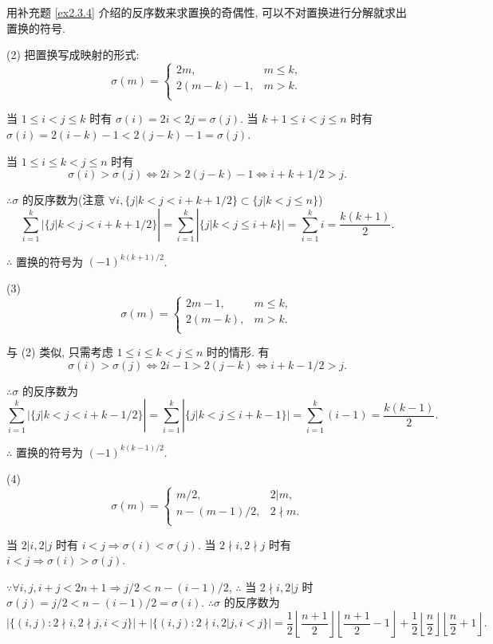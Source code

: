 \documentclass{ctexart}
\begin{document}
\begin{solution}
    用补充题 \ref{ex2.3.4} 介绍的反序数来求置换的奇偶性, 可以不对置换进行分解就求出置换的符号.

    (2) 把置换写成映射的形式:
    \[\sigma(m)=\begin{cases}
        2m, & m\leq k, \\
        2(m-k)-1, & m>k. \\
    \end{cases}\]

    当 $1\leq i<j\leq k$ 时有 $\sigma(i)=2i<2j=\sigma(j)$. 当 $k+1\leq i<j\leq n$ 时有 $\sigma(i)=2(i-k)-1<2(j-k)-1=\sigma(j)$.

    当 $1\leq i\leq k<j\leq n$ 时有
    \[\sigma(i)>\sigma(j)\Leftrightarrow2i>2(j-k)-1\Leftrightarrow i+k+1/2>j.\]

    $\therefore\sigma$ 的反序数为(注意 $\forall i,\{j|k<j<i+k+1/2\}\subset\{j|k<j\leq n\}$)
    \[\sum\limits_{i=1}^k|\{j|k<j<i+k+1/2\}|=\sum\limits_{i=1}^k|\{j|k<j\leq i+k\}|=\sum\limits_{i=1}^ki=\dfrac{k(k+1)}{2}.\]

    $\therefore$ 置换的符号为 $(-1)^{k(k+1)/2}$.

    (3)
    \[\sigma(m)=\begin{cases}
        2m-1, & m\leq k, \\
        2(m-k), & m>k. \\
    \end{cases}\]

    与 (2) 类似, 只需考虑 $1\leq i\leq k<j\leq n$ 时的情形. 有
    \[\sigma(i)>\sigma(j)\Leftrightarrow2i-1>2(j-k)\Leftrightarrow i+k-1/2>j.\]

    $\therefore\sigma$ 的反序数为
    \[\sum\limits_{i=1}^k|\{j|k<j<i+k-1/2\}|=\sum\limits_{i=1}^k|\{j|k<j\leq i+k-1\}|=\sum\limits_{i=1}^k(i-1)=\dfrac{k(k-1)}{2}.\]

    $\therefore$ 置换的符号为 $(-1)^{k(k-1)/2}$.

    (4)
    \[\sigma(m)=\begin{cases}
        m/2, & 2|m, \\
        n-(m-1)/2, & 2\nmid m. \\
    \end{cases}\]
    
    当 $2|i,2|j$ 时有 $i<j\Rightarrow\sigma(i)<\sigma(j)$. 当 $2\nmid i,2\nmid j$ 时有 $i<j\Rightarrow\sigma(i)>\sigma(j)$.

    $\because\forall i,j,i+j<2n+1\Rightarrow j/2<n-(i-1)/2$, $\therefore$ 当 $2\nmid i,2|j$ 时 $\sigma(j)=j/2<n-(i-1)/2=\sigma(i)$. $\therefore\sigma$ 的反序数为
    \[|\{(i,j):2\nmid i,2\nmid j,i<j\}|+|\{(i,j):2\nmid i,2|j,i<j\}|=\dfrac{1}{2}\left\lfloor\dfrac{n+1}{2}\right\rfloor\left\lfloor\dfrac{n+1}{2}-1\right\rfloor+\dfrac{1}{2}\left\lfloor\dfrac{n}{2}\right\rfloor\left\lfloor\dfrac{n}{2}+1\right\rfloor.\]


\end{solution}
\end{document}
